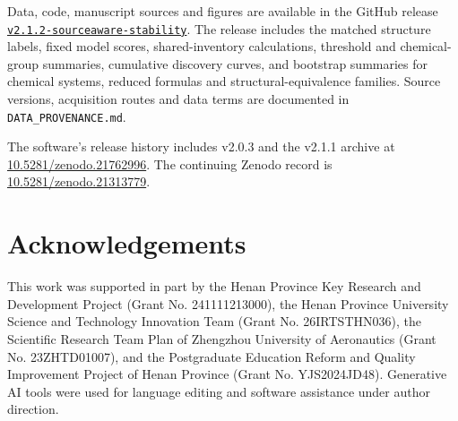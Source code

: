 \documentclass[twoside,twocolumn,9pt]{article}
\begin{document}
Data, code, manuscript sources and figures are available in the GitHub release \href{https://github.com/Marchematics/materials-stability-label-discordance/releases/tag/v2.1.2-sourceaware-stability}{\texttt{v2.1.2-sourceaware-stability}}. The release includes the matched structure labels, fixed model scores, shared-inventory calculations, threshold and chemical-group summaries, cumulative discovery curves, and bootstrap summaries for chemical systems, reduced formulas and structural-equivalence families. Source versions, acquisition routes and data terms are documented in \texttt{DATA\_PROVENANCE.md}.

The software's release history includes v2.0.3\cite{sourceaware2026release} and the v2.1.1 archive at \href{https://doi.org/10.5281/zenodo.21762996}{10.5281/zenodo.21762996}. The continuing Zenodo record is \href{https://doi.org/10.5281/zenodo.21313779}{10.5281/zenodo.21313779}.

\section*{Acknowledgements}

This work was supported in part by the Henan Province Key Research and Development Project (Grant No. 241111213000), the Henan Province University Science and Technology Innovation Team (Grant No. 26IRTSTHN036), the Scientific Research Team Plan of Zhengzhou University of Aeronautics (Grant No. 23ZHTD01007), and the Postgraduate Education Reform and Quality Improvement Project of Henan Province (Grant No. YJS2024JD48). Generative AI tools were used for language editing and software assistance under author direction.

\balance


\end{document}
